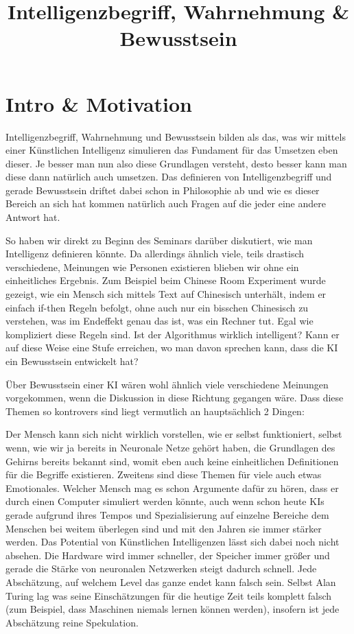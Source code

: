 \title{Intelligenzbegriff, Wahrnehmung \& Bewusstsein}

\section{Intro \& Motivation}
Intelligenzbegriff, Wahrnehmung und Bewusstsein bilden als das, was wir mittels einer Künstlichen Intelligenz simulieren das Fundament für das Umsetzen eben dieser.
Je besser man nun also diese Grundlagen versteht, desto besser kann man diese dann natürlich auch umsetzen.
Das definieren von Intelligenzbegriff und gerade Bewusstsein driftet dabei schon in Philosophie ab und wie es dieser Bereich an sich hat kommen natürlich auch Fragen auf die jeder eine andere Antwort hat.

So haben wir direkt zu Beginn des Seminars darüber diskutiert, wie man Intelligenz definieren könnte.
Da allerdings ähnlich viele, teils drastisch verschiedene, Meinungen wie Personen existieren blieben wir ohne ein einheitliches Ergebnis.
Zum Beispiel beim Chinese Room Experiment wurde gezeigt, wie ein Mensch sich mittels Text auf Chinesisch unterhält, indem er einfach if-then Regeln befolgt, ohne auch nur ein bisschen Chinesisch zu verstehen, was im Endeffekt genau das ist, was ein Rechner tut.
Egal wie kompliziert diese Regeln sind.
Ist der Algorithmus wirklich intelligent? Kann er auf diese Weise eine Stufe erreichen, wo man davon sprechen kann, dass die KI ein Bewusstsein entwickelt hat?

Über Bewusstsein einer KI wären wohl ähnlich viele verschiedene Meinungen vorgekommen, wenn die Diskussion in diese Richtung gegangen wäre.
Dass diese Themen so kontrovers sind liegt vermutlich an hauptsächlich 2 Dingen:

Der Mensch kann sich nicht wirklich vorstellen, wie er selbst funktioniert, selbst wenn, wie wir ja bereits in Neuronale Netze gehört haben, die Grundlagen des Gehirns bereits bekannt sind, womit eben auch keine einheitlichen Definitionen für die Begriffe existieren.
Zweitens sind diese Themen für viele auch etwas Emotionales.
Welcher Mensch mag es schon Argumente dafür zu hören, dass er durch einen Computer simuliert werden könnte, auch wenn schon heute KIs gerade aufgrund ihres Tempos und Spezialisierung auf einzelne Bereiche dem Menschen bei weitem überlegen sind und mit den Jahren sie immer stärker werden.
Das Potential von Künstlichen Intelligenzen lässt sich dabei noch nicht absehen.
Die Hardware wird immer schneller, der Speicher immer größer und gerade die Stärke von neuronalen Netzwerken steigt dadurch schnell.
Jede Abschätzung, auf welchem Level das ganze endet kann falsch sein.
Selbst Alan Turing lag was seine Einschätzungen für die heutige Zeit teils komplett falsch (zum Beispiel, dass Maschinen niemals lernen können werden), insofern ist jede Abschätzung reine Spekulation.

